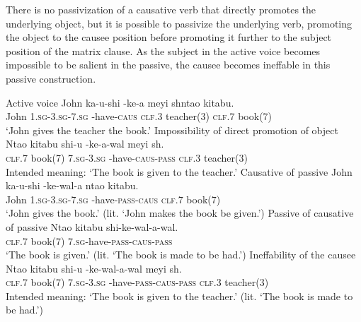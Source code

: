 There is no passivization of a causative verb that directly promotes the underlying object, but it is possible to passivize the underlying verb, promoting the object to the causee position before promoting it further to the subject position of the matrix clause. As the subject in the active voice becomes impossible to be salient in the passive, the causee becomes ineffable in this passive construction.

\begin{exe}
\ex
\begin{xlist}
\ex Active voice
\gll John ka-u-shi -ke-\textbeltl a meyi sh\textramshorns nta\textbeltl o kitabu. \\
John \textsc{1.sg}-\textsc{3.sg}-\textsc{7.sg} -have-\textsc{caus} \textsc{clf.3} teacher(3) \textsc{clf.7} book(7) \\
\trans `John gives the teacher the book.'
\ex Impossibility of direct promotion of object
\gll * Nta\textbeltl o kitabu shi-u {-ke-\textbeltl a-wal\textramshorns} meyi sh\textramshorns. \\
{} \textsc{clf.7} book(7) \textsc{7.sg}-\textsc{3.sg} -have-\textsc{caus}-\textsc{pass} \textsc{clf.3} teacher(3) \\
\trans Intended meaning: `The book is given to the teacher.'
\ex Causative of passive
\gll John ka-u-shi -ke-wal\textramshorns-\textbeltl a nta\textbeltl o kitabu. \\
John \textsc{1.sg}-\textsc{3.sg}-\textsc{7.sg} -have-\textsc{pass}-\textsc{caus} \textsc{clf.7} book(7) \\
\trans `John gives the book.' (lit. `John makes the book be given.')
\ex Passive of causative of passive
\gll Nta\textbeltl o kitabu shi-ke-wal\textramshorns-\textbeltl a-wal\textramshorns. \\
\textsc{clf.7} book(7) \textsc{7.sg}-have-\textsc{pass}-\textsc{caus}-\textsc{pass} \\
\trans `The book is given.' (lit. `The book is made to be had.')
\ex Ineffability of the causee
\gll * Nta\textbeltl o kitabu shi-u {-ke-wal\textramshorns-\textbeltl a-wal\textramshorns} meyi sh\textramshorns. \\
{} \textsc{clf.7} book(7) \textsc{7.sg}-\textsc{3.sg} -have-\textsc{pass}-\textsc{caus}-\textsc{pass} \textsc{clf.3} teacher(3) \\
\trans Intended meaning: `The book is given to the teacher.' (lit. `The book is made to be had.')
\end{xlist}
\end{exe}

